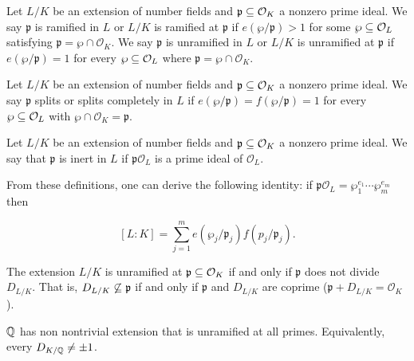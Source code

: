 \begin{definition}[Ramified]
    Let $L/K$ be an extension of number fields and $\mathfrak{p} \subseteq \mathcal{O}_{K}$ a nonzero prime ideal. We say $\mathfrak{p}$ is ramified in $L$ or $L/K$ is ramified at $\mathfrak{p}$ if $e(\wp /\mathfrak{p}) > 1$ for some $\wp  \subseteq \mathcal{O}_{L}$ satisfying $\mathfrak{p} = \wp \cap \mathcal{O}_{K}$. We say $\mathfrak{p}$ is unramified in $L$ or $L/K$ is unramified at $\mathfrak{p}$ if $e(\wp /\mathfrak{p}) =1$ for every $\wp  \subseteq \mathcal{O}_{L}$ where $\mathfrak{p} = \wp \cap \mathcal{O}_{K}$.
\end{definition}

\begin{definition}
    Let $L/K$ be an extension of number fields and $\mathfrak{p} \subseteq \mathcal{O}_{K}$ a nonzero prime ideal. We say $\mathfrak{p}$ splits or splits completely in $L$ if $e(\wp /\mathfrak{p}) = f(\wp /\mathfrak{p}) = 1$ for every $\wp  \subseteq \mathcal{O}_{L}$ with $\wp  \cap \mathcal{O}_{K} = \mathfrak{p}$.
\end{definition}

\begin{definition}[Inert]
    Let $L/K$ be an extension of number fields and $\mathfrak{p} \subseteq \mathcal{O}_{K}$ a nonzero prime ideal. We say that $\mathfrak{p}$ is inert in $L$ if $\mathfrak{p}\mathcal{O}_{L}$ is a prime ideal of $\mathcal{O}_{L}$.
\end{definition}

From these definitions, one can derive the following identity: if $\mathfrak{p} \mathcal{O}_{L} = \wp _1^{e_1}\cdots \wp _m^{e_m}$ then 

    \[[L:K] = \sum_{j=1}^m e(\wp _j/\mathfrak{p}_j)f(\mathit{p}_j/\mathfrak{p}_j).\]

\begin{theorem}
    The extension $L/K$ is unramified at $\mathfrak{p} \subseteq \mathcal{O}_{K}$ if and only if $\mathfrak{p}$ does not divide $D_{L/K}$.  That is, $D_{L/K} \not\subseteq \mathfrak{p}$ if and only if $\mathfrak{p}$ and $D_{L/K}$ are coprime ($\mathfrak{p} + D_{L/K} = \mathcal{O}_{K}$).
\end{theorem}

\begin{theorem}[Minkowski]
    $\mathbb{Q}$ has non nontrivial extension that is unramified at all primes. Equivalently, every $D_{K/\mathbb{Q}} \neq \pm 1$.
\end{theorem}

